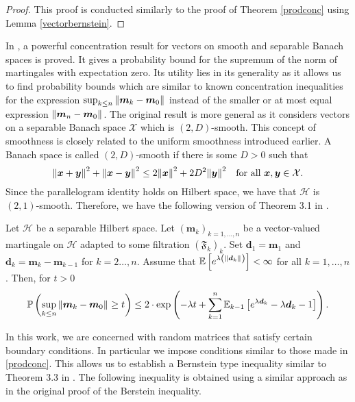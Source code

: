 \begin{proof}
  This proof is conducted similarly to the proof of Theorem \ref{prodconc} using Lemma \ref{vectorbernstein}.
\end{proof}


In \cite{pinelis2012freedman}, a powerful concentration result for vectors on smooth and separable Banach spaces is proved. It gives a probability bound for the supremum of the norm of martingales with expectation zero. Its utility lies in its generality as it allows us to find probability bounds which are similar to known concentration inequalities for the expression \( \sup_{k\leq n} \norm{\bm{m}_k - \bm{m}_0}_{} \) instead of the smaller or at most equal expression \( \norm{\bm{m}_n-\bm{m}_0}_{} \). The original result is more general as it considers vectors on a separable Banach space \( \mathcal{X} \) which is \( (2,D) \)-smooth. This concept of smoothness is closely related to the uniform smoothness introduced earlier. A Banach space is called \( (2,D) \)-smooth if there is some \( D>0 \) such that
    \[ \norm{\bm{x}+\bm{y}}_{}^{2} + \norm{\bm{x}-\bm{y}}_{}^{2} \leq 2 \norm{\bm{x}}_{}^{2} + 2D^2 \norm{\bm{y}}_{}^{2} \quad \text{for all \( \bm{x},\bm{y} \in \mathcal{X} \)}. \]
    Since the parallelogram identity holds on Hilbert space, we have that \( \mathcal{H} \) is \( (2,1) \)-smooth. Therefore, we have the following version of Theorem 3.1 in \cite{pinelis2012freedman}.
\begin{lem}
  Let \( \mathcal{H} \) be a separable Hilbert space. Let \( (\bm{m}_k)_{k=1, \dots, n} \) be a vector-valued martingale on \( \mathcal{H} \) adapted to some filtration \( \left(\mathfrak{F}_k\right)_k \). Set \( \bm{d}_1=\bm{m}_1 \) and \( \bm{d}_k= \bm{m}_k - \bm{m}_{k-1} \) for \( k=2 \dots, n \). Assume that \( \mathbb{E}\left[e^{\lambda\left(\norm{\bm{d}_k}_{}\right)}\right]< \infty \) for all \( k=1, \dots, n \). Then, for \( t > 0 \)
    \[ \mathbb{P}\left(\sup_{k \leq n} \norm{\bm{m}_k-\bm{m}_0}_{} \geq t\right) \leq 2 \cdot \operatorname{exp}\left(-\lambda t + \sum_{k=1}^{n} \mathbb{E}_{k-1}\left[e^{\lambda \bm{d}_k}- \lambda \bm{d}_k - 1\right]\right).\]
\end{lem}

In this work, we are concerned with random matrices that satisfy certain boundary conditions. In particular we impose conditions similar to those made in \ref{prodconc}. This allows us to establish a Bernstein type inequality similar to Theorem 3.3 in \cite{pinelis2012freedman}. The following inequality is obtained using a similar approach as in the original proof of the Berstein inequality. 


